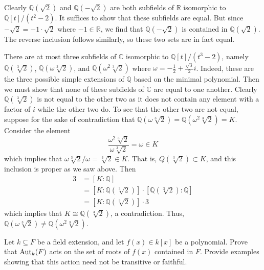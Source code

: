 \documentclass[../../master.tex]{subfiles}
\begin{document}
\begin{solution}
    Clearly $\mathbb{Q}(\sqrt{2})$ and $\mathbb{Q}(-\sqrt{2})$ are both subfields of $\mathbb{R}$ isomorphic to $\mathbb{Q}[t] / (t^2 - 2)$.
    It suffices to show that these subfields are equal.
    But since $-\sqrt{2} = -1 \cdot \sqrt{2}$ where $-1 \in \mathbb{R}$, we find that $\mathbb{Q}(-\sqrt{2})$ is contained in $\mathbb{Q}(\sqrt{2})$.
    The reverse inclusion follows similarly, so these two sets are in fact equal.

    There are at most three subfields of $\mathbb{C}$ isomorphic to $\mathbb{Q}[t] / (t^3 - 2)$, namely $\mathbb{Q}(\sqrt[3]{2})$, $\mathbb{Q}(\omega \sqrt[3]{2})$, and $\mathbb{Q}(\omega^2 \sqrt[3]{2})$ where $\omega = -\frac{1}{2} + \frac{\sqrt{3}}{2}i$.
    Indeed, these are the three possible simple extensions of $\mathbb{Q}$ based on the minimal polynomial.
    Then we must show that none of these subfields of $\mathbb{C}$ are equal to one another.
    Clearly $\mathbb{Q}(\sqrt[3]{2})$ is not equal to the other two as it does not contain any element with a factor of $i$ while the other two do.
    To see that the other two are not equal, suppose for the sake of contradiction that $\mathbb{Q}(\omega \sqrt[3]{2}) = \mathbb{Q}(\omega^2 \sqrt[3]{2}) = K$.
    Consider the element
    \[
        \frac{\omega^2 \sqrt[3]{2}}{\omega \sqrt[3]{2}} = \omega \in K
    \]
    which implies that $\omega \sqrt[3]{2} / \omega = \sqrt[3]{2} \in K$.
    That is, $Q(\sqrt[3]{2}) \subset K$, and this inclusion is proper as we saw above.
    Then 
    \begin{align*}
        3 &= [K : \mathbb{Q}] \\
          &= [K : \mathbb{Q}(\sqrt[3]{2})] \cdot [\mathbb{Q}(\sqrt[3]{2}) : \mathbb{Q}] \\
          &= [K :\mathbb{Q}(\sqrt[3]{2})] \cdot 3
    \end{align*}
    which implies that $K \cong \mathbb{Q}(\sqrt[3]{2})$, a contradiction.
    Thus, $\mathbb{Q}(\omega \sqrt[3]{2}) \neq \mathbb{Q}(\omega^2 \sqrt[3]{2})$.
\end{solution}

\begin{problem}
    Let $k \subseteq F$ be a field extension, and let $f(x) \in k[x]$ be a polynomial.
    Prove that $\operatorname{Aut}_k(F)$ acts on the set of roots of $f(x)$ contained in $F$.
    Provide examples showing that this action need not be transitive or faithful.
\end{problem}
\end{document}
